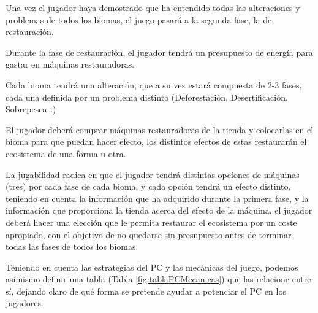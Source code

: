 Una vez el jugador haya demostrado que ha entendido todas las alteraciones y problemas de todos los biomas, el juego pasará a la segunda fase, la de restauración.
\begin{compactitem}
    \item Durante la fase de restauración, el jugador tendrá un presupuesto de energía para gastar en máquinas restauradoras.
    \item Cada bioma tendrá una alteración, que a su vez estará compuesta de 2-3 fases, cada una definida por un problema distinto (Deforestación, Desertificación, Sobrepesca…)
    \item El jugador deberá comprar máquinas restauradoras de la tienda y colocarlas en el bioma para que puedan hacer efecto, los distintos efectos de estas restaurarán el ecosistema de una forma u otra.
    \item La jugabilidad radica en que el jugador tendrá distintas opciones de máquinas (tres) por cada fase de cada bioma, y cada opción tendrá un efecto distinto, teniendo en cuenta la información que ha adquirido durante la primera fase, y la información que proporciona la tienda acerca del efecto de la máquina, el jugador deberá hacer una elección que le permita restaurar el ecosistema por un coste apropiado, con el objetivo de no quedarse sin presupuesto antes de terminar todas las fases de todos los biomas.
\end{compactitem}

Teniendo en cuenta las estrategias del PC y las mecánicas del juego, podemos asimismo definir una tabla (Tabla \ref{fig:tablaPCMecanicas}) que las relacione entre sí, dejando claro de qué forma se pretende ayudar a potenciar el PC en los jugadores.

